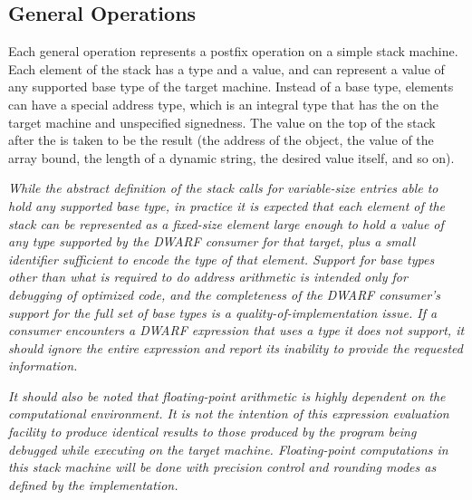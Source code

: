 \subsection{General Operations}
\label{chap:generaloperations}
Each general operation represents a postfix operation on
a simple stack machine. 
Each element of the stack has a type and a value, and can represent
a value of any supported base type of the target machine.  Instead of
a base type, elements can have a special address type, 
which is an integral type that has the 
 on the target machine and 
unspecified signedness. The value on the top of the stack after 
 the 
is 
taken to be the result (the address of the object, the
value of the array bound, the length of a dynamic string,
the desired value itself, and so on).

\textit{While the abstract definition of the stack calls for variable-size entries
able to hold any supported base type, in practice it is expected that each
element of the stack can be represented as a fixed-size element large enough
to hold a value of any type supported by the DWARF consumer for that target,
plus a small identifier sufficient to encode the type of that element.
Support for base types other than what is required to do address arithmetic
is intended only for debugging of optimized code, and the completeness of the
DWARF consumer's support for the full set of base types is a
quality-of-implementation issue. If a consumer encounters a DWARF expression
that uses a type it does not support, it should ignore the entire expression
and report its inability to provide the requested information.}

\textit{It should also be noted that floating-point arithmetic is highly dependent
on the computational environment. It is not the intention of this expression
evaluation facility to produce identical results to those produced by the
program being debugged while executing on the target machine. Floating-point
computations in this stack machine will be done with precision control and
rounding modes as defined by the implementation.}

